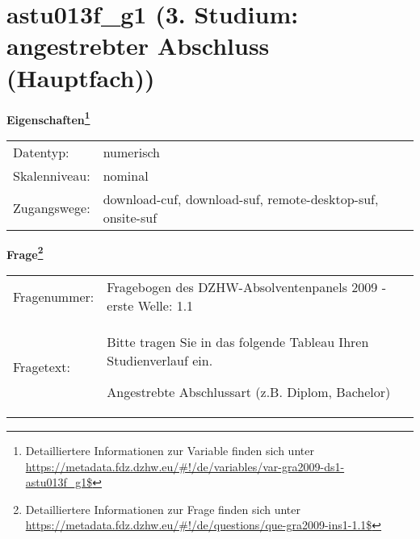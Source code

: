 
    \setcounter{footnote}{0}

    \vspace*{-1.8cm}
	\section{astu013f\_g1 (3. Studium: angestrebter Abschluss (Hauptfach))}
	\label{section:astu013f_g1}



    \vspace*{0.5cm}
    \noindent\textbf{Eigenschaften\footnote{Detailliertere Informationen zur Variable finden sich unter
		\url{https://metadata.fdz.dzhw.eu/\#!/de/variables/var-gra2009-ds1-astu013f_g1$}}}\\
	\begin{tabularx}{\hsize}{@{}lX}
	Datentyp: & numerisch \\
	Skalenniveau: & nominal \\
	Zugangswege: &
	  download-cuf, 
	  download-suf, 
	  remote-desktop-suf, 
	  onsite-suf
 \\
    \end{tabularx}



				\vspace*{0.5cm}
                \noindent\textbf{Frage\footnote{Detailliertere Informationen zur Frage finden sich unter
		              \url{https://metadata.fdz.dzhw.eu/\#!/de/questions/que-gra2009-ins1-1.1$}}}\\
				\begin{tabularx}{\hsize}{@{}lX}
					Fragenummer: &
					  Fragebogen des DZHW-Absolventenpanels 2009 - erste Welle:
					  1.1
 \\
					Fragetext: & Bitte tragen Sie in das folgende Tableau Ihren Studienverlauf ein.\par  Angestrebte Abschlussart (z.B. Diplom, Bachelor) \\
				\end{tabularx}






